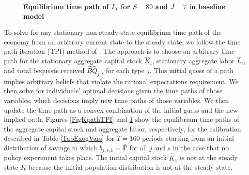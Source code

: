 \documentclass[letterpaper,12pt]{article}
\theoremstyle{definition}
\begin{document}
  \begin{figure}[htb]\centering \captionsetup{width=4.0in}
    \caption{\label{FigLpathTPI}\textbf{Equilibrium time path of $L_t$ for $S=80$ and $J=7$ in baseline model}}
  \end{figure}

  To solve for any stationary non-steady-state equilibrium time path of the economy from an arbitrary current state to the steady state, we follow the time path iteration (TPI) method of \citet{AuerbachKotlikoff:1987}. The approach is to choose an arbitrary time path for the stationary aggregate capital stock $\hat{K}_t$, stationary aggregate labor $\hat{L}_t$, and total bequests received $\hat{BQ}_{j,t}$ for each type $j$. This initial guess of a path implies arbitrary beliefs that violate the rational expectations requirement. We then solve for individuals' optimal decisions given the time paths of those variables, which decisions imply new time paths of those variables. We then update the time path as a convex combination of the initial guess and the new implied path. Figures \ref{FigKpathTPI} and \ref{FigLpathTPI} show the equilibrium time paths of the aggregate capital stock and aggregate labor, respectively, for the calibration described in Table \ref{TabExogVars} for $T=160$ periods starting from an initial distribution of savings in which $b_{j,s,1}=\bm{\bar{\Gamma}}$ for all $j$ and $s$ in the case that no policy experiment takes place. The initial capital stock $\hat{K}_1$ is not at the steady state $\bar{K}$ because the initial population distribution is not at the steady-state.
\end{document}
